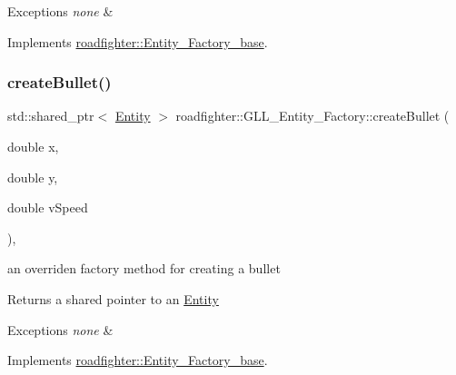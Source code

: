 \begin{DoxyExceptions}{Exceptions}
{\em none} & \\
\hline
\end{DoxyExceptions}


Implements \hyperlink{classroadfighter_1_1Entity__Factory__base_a888f537d2deed2d90a391c1900e9fdb6}{roadfighter\+::\+Entity\+\_\+\+Factory\+\_\+base}.

\mbox{\label{classroadfighter_1_1GLL__Entity__Factory_a7fcd57b8a2ae18240476f6dc64216822}} 
\subsubsection{\texorpdfstring{create\+Bullet()}{createBullet()}}
{\footnotesize\ttfamily std\+::shared\+\_\+ptr$<$ \hyperlink{classroadfighter_1_1Entity}{Entity} $>$ roadfighter\+::\+G\+L\+L\+\_\+\+Entity\+\_\+\+Factory\+::create\+Bullet (\begin{DoxyParamCaption}\item[{double}]{x,  }\item[{double}]{y,  }\item[{double}]{v\+Speed }\end{DoxyParamCaption})\hspace{0.3cm}{\ttfamily [override]}, {\ttfamily [virtual]}}

an overriden factory method for creating a bullet \begin{DoxyReturn}{Returns}
a shared pointer to an \hyperlink{classroadfighter_1_1Entity}{Entity} 
\end{DoxyReturn}

\begin{DoxyExceptions}{Exceptions}
{\em none} & \\
\hline
\end{DoxyExceptions}


Implements \hyperlink{classroadfighter_1_1Entity__Factory__base_a5241bdb886a9f1b086d009a0f6478045}{roadfighter\+::\+Entity\+\_\+\+Factory\+\_\+base}.

\mbox{\label{classroadfighter_1_1GLL__Entity__Factory_ae26222829d8295cef0aa708a7ee909b7}} 
